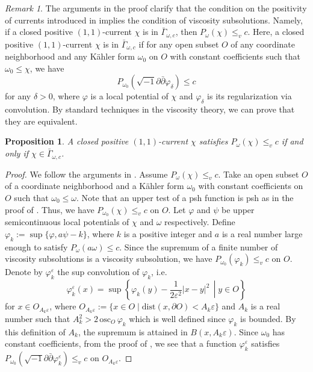 \documentclass{amsart}
\numberwithin{equation}{section}
\theoremstyle{plain}
\newtheorem{prop}[equation]{Proposition}
\theoremstyle{definition}
\theoremstyle{remark}
\newtheorem{remark}[equation]{Remark}
\newcommand{\delb}{\sqrt{-1}\partial\bar{\partial}}
\newcommand{\relmiddle}[1]{\mathrel{}\middle#1\mathrel{}}
\begin{document}
\begin{remark}
    The arguments in the proof clarify that the condition on the positivity of currents introduced in \cite[Definition 3.3]{GChen} implies the condition of viscosity subsolutions. Namely, if a closed positive $(1,1)$-current $\chi$ is in $\bar{\Gamma}_{\omega,c}$, then
    $P_\omega(\chi)\le_v c.$ Here, a closed positive $(1,1)$-current $\chi$ is in $\bar{\Gamma}_{\omega,c}$ if for any open subset $O$ of any coordinate neighborhood and any K{\"a}hler form $\omega_0$ on $O$ with constant coefficients such that $\omega_0 \le \chi$, we have
    $$P_{\omega_0}(\delb \varphi_\delta) \le c$$
    for any $\delta>0$,
    where $\varphi$ is a local potential of $\chi$ and $\varphi_\delta$ is its regularization via convolution.
    By standard techniques in the viscosity theory, we can prove that they are equivalent.
    \begin{prop}\label{propequivalence}
        A closed positive  $(1,1)$-current $\chi$ satisfies $P_\omega(\chi)\le_v c$ if and only if $\chi \in \bar{\Gamma}_{\omega,c}$.
    \end{prop}
    \begin{proof}
        We follow the arguments in \cite[Proposition 1.11 and Theorem 1.9]{EGZ}. Assume $P_\omega(\chi)\le_v c$.
        Take an open subset $O$ of a coordinate neighborhood and a K{\"a}hler form $\omega_0$ with constant coefficients on $O$ such that $\omega_0\le\omega$. Note that an upper test of a psh function is psh as in the proof of \cite[Proposition 1.3]{EGZ}. Thus, we have $P_{\omega_0}(\chi)\le_v c$ on $O$. Let $\varphi$ and $\psi$ be upper semicontinuous local potentials of $\chi$ and $\omega$ respectively. Define $\varphi_k:=\sup\{\varphi,a\psi-k\}$, where $k$ is a positive integer and $a$ is a real number large enough to satisfy $P_\omega(a\omega)\le c$. Since the supremum of a finite number of viscosity subsolutions is a viscosity subsolution, we have $P_{\omega_0}(\varphi_k)\le_v c$ on $O$. Denote by $\varphi_k^\varepsilon$ the sup convolution of $\varphi_k$, i.e.
        $$\varphi_k^\varepsilon(x) = \sup \left\{ \varphi_k(y)-\frac{1}{2\varepsilon^2}|x-y|^2 \, \relmiddle{|} y \in O \right\}$$
        for $x\in O_{A_k \varepsilon}$, where $O_{A_k \varepsilon}:=\{x\in O\mid \mathrm{dist}(x,\partial O)<A_k \varepsilon\}$ and $A_k$ is a real number such that $A_k^2>2\, \mathrm{osc}_O \, \varphi_k$ which is well defined since $\varphi_k$ is bounded. By this definition of $A_k$, the supremum is attained in $B(x, A_k \varepsilon)$.
        Since $\omega_0$ has constant coefficients, from the proof of \cite[Proposition 4.2]{Ishii}, we see that a function $\varphi_k^\varepsilon$ satisfies $P_{\omega_0}(\delb \varphi_k^\varepsilon)\le_v c$ on $O_{A_k\varepsilon}$.

\end{proof}
\end{remark}
\end{document}
